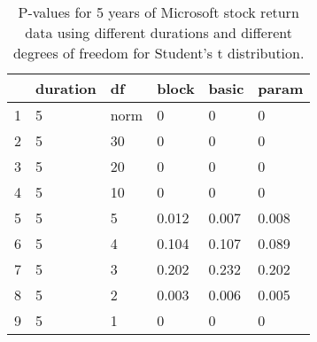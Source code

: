 \begin{table}[ht]
\centering
\caption{P-values for 5 years of Microsoft stock return 
                   data using different durations
  and different degrees of freedom for Student's t distribution.} 
\label{table:microsoft5}
\begin{tabular}{rlllll}
  \hline
 & duration & df & block & basic & param \\ 
  \hline
1 & 5 & norm & 0 & 0 & 0 \\ 
  2 & 5 & 30 & 0 & 0 & 0 \\ 
  3 & 5 & 20 & 0 & 0 & 0 \\ 
  4 & 5 & 10 & 0 & 0 & 0 \\ 
  5 & 5 & 5 & 0.012 & 0.007 & 0.008 \\ 
  6 & 5 & 4 & 0.104 & 0.107 & 0.089 \\ 
  7 & 5 & 3 & 0.202 & 0.232 & 0.202 \\ 
  8 & 5 & 2 & 0.003 & 0.006 & 0.005 \\ 
  9 & 5 & 1 & 0 & 0 & 0 \\ 
   \hline
\end{tabular}
\end{table}

